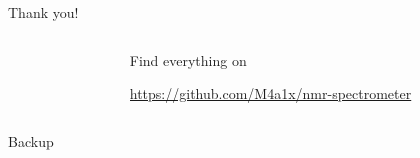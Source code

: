 \documentclass{ethpresentation}
\begin{document}
\begin{frame}{Thank you!}
    \begin{columns}
        \begin{column}{0.5\textwidth}
            \centering
            
        \end{column}
        \begin{column}{0.5\textwidth}
            \centering
            Find everything on \\ \vspace*{\baselineskip}

            

            \url{https://github.com/M4a1x/nmr-spectrometer}
        \end{column}
    \end{columns}
\end{frame}



\appendix

\begin{frame}[standout]
    Backup
\end{frame}
\end{document}
